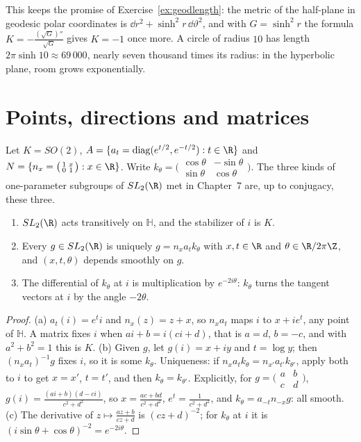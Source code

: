 This keeps the promise of Exercise~\ref{ex:geodlength}: the metric of the half-plane in geodesic polar coordinates is $\dd r^2+\sinh^2r\,\dd\vartheta^2$, and with $G=\sinh^2r$ the formula
$K=-\frac{(\sqrt G)''}{\sqrt G}$ gives $K=-1$ once more. A circle of radius $10$ has length $2\pi\sinh10\approx69\,000$, nearly seven thousand times its radius: in the hyperbolic plane, room grows exponentially.

\section{Points, directions and matrices}

Let $K=SO(2)$, $A=\{a_t=\mathrm{diag}(e^{t/2},e^{-t/2}):t\in\R\}$ and $N=\{n_x=\bigl(\begin{smallmatrix}1&x\\0&1\end{smallmatrix}\bigr):x\in\R\}$. Write $k_\theta=\bigl(\begin{smallmatrix}\cos\theta&-\sin\theta\\\sin\theta&\cos\theta\end{smallmatrix}\bigr)$. The three kinds of
one-parameter subgroups of $SL_2(\R)$ met in Chapter~7 are, up to conjugacy, these three.

\begin{theorem}\label{thm:iwasawa}
\begin{enumerate}
\item[(a)] $SL_2(\R)$ acts transitively on $\mathbb H$, and the stabilizer of $i$ is $K$.
\item[(b)] Every $g\in SL_2(\R)$ is uniquely $g=n_xa_tk_\theta$ with $x,t\in\R$ and $\theta\in\R/2\pi\Z$, and $(x,t,\theta)$ depends smoothly on $g$.
\item[(c)] The differential of $k_\theta$ at $i$ is multiplication by $e^{-2i\theta}$: $k_\theta$ turns the tangent vectors at $i$ by the angle $-2\theta$.
\end{enumerate}
\end{theorem}

\begin{proof}
(a) $a_t(i)=e^ti$ and $n_x(z)=z+x$, so $n_xa_t$ maps $i$ to $x+ie^t$, any point of $\mathbb H$. A matrix fixes $i$ when $ai+b=i(ci+d)$, that is $a=d$, $b=-c$, and with
$a^2+b^2=1$ this is $K$. (b) Given $g$, let $g(i)=x+iy$ and $t=\log y$; then $(n_xa_t)^{-1}g$ fixes $i$, so it is some $k_\theta$. Uniqueness: if $n_xa_tk_\theta=n_{x'}a_{t'}k_{\theta'}$, apply both to $i$ to get $x=x'$,
$t=t'$, and then $k_\theta=k_{\theta'}$. Explicitly, for $g=\bigl(\begin{smallmatrix}a&b\\c&d\end{smallmatrix}\bigr)$, $g(i)=\frac{(ai+b)(d-ci)}{c^2+d^2}$, so $x=\frac{ac+bd}{c^2+d^2}$, $e^t=\frac1{c^2+d^2}$, and $k_\theta=a_{-t}n_{-x}g$: all smooth. (c) The
derivative of $z\mapsto\frac{az+b}{cz+d}$ is $(cz+d)^{-2}$; for $k_\theta$ at $i$ it is $(i\sin\theta+\cos\theta)^{-2}=e^{-2i\theta}$.
\end{proof}

